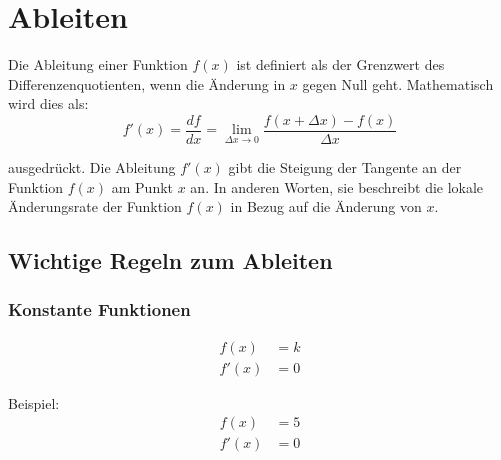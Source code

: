 \documentclass[11pt, openany]{book}
\begin{document}
\newpage

\section{Ableiten}
Die Ableitung einer Funktion $f(x)$ ist definiert als der Grenzwert des Differenzenquotienten, wenn die Änderung in $x$ gegen Null geht. Mathematisch wird dies als:
\begin{equation*}
f'(x) = \frac{df}{dx} = \lim_{\Delta x\to 0} \frac{f(x + \Delta x) - f(x)}{\Delta x}
\end{equation*}

ausgedrückt. Die Ableitung $f'(x)$ gibt die Steigung der Tangente an der Funktion $f(x)$ am Punkt $x$ an. In anderen Worten, sie beschreibt die lokale Änderungsrate der Funktion $f(x)$ in Bezug auf die Änderung von $x$.

\subsection{Wichtige Regeln zum Ableiten}

\newlength{\boxwidth}
\setlength{\boxwidth}{0.45\textwidth}
\newlength{\examplewidth}
\setlength{\examplewidth}{0.45\textwidth}

\subsubsection{Konstante Funktionen}
\noindent\begin{minipage}{\boxwidth}
\begin{tcolorbox}
\begin{align*}
    f(x) &= k \\
    f'(x) &= 0
\end{align*}
\end{tcolorbox}
\end{minipage}
\hfill
\begin{minipage}{\examplewidth}
Beispiel:
\begin{align*}
    f(x) &= 5 \\
    f'(x) &= 0
\end{align*}
\end{minipage}
\end{document}

